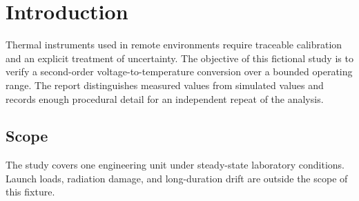 \chapter{Introduction}
Thermal instruments used in remote environments require traceable calibration
and an explicit treatment of uncertainty. The objective of this fictional study
is to verify a second-order voltage-to-temperature conversion over a bounded
operating range. The report distinguishes measured values from simulated values
and records enough procedural detail for an independent repeat of the analysis.

\section{Scope}
The study covers one engineering unit under steady-state laboratory conditions.
Launch loads, radiation damage, and long-duration drift are outside the scope of
this fixture.

